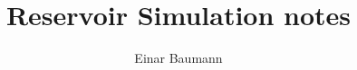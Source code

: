 



\author{Einar Baumann}
\title{Reservoir Simulation notes}


  \maketitle
  \clearpage

 \clearpage
 \clearpage
 \clearpage
 \clearpage
 \clearpage
 \clearpage
 \clearpage
 \clearpage


